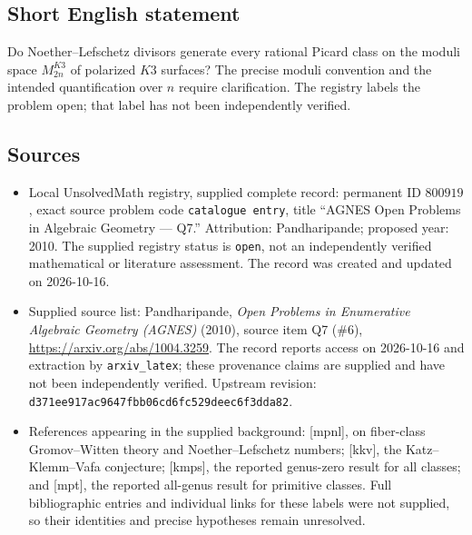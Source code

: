 \documentclass[11pt]{article}
\begin{document}
\subsection{Short English statement}
Do Noether--Lefschetz divisors generate every rational Picard class on the moduli space \(M^{K3}_{2n}\) of polarized \(K3\) surfaces? The precise moduli convention and the intended quantification over \(n\) require clarification. The registry labels the problem open; that label has not been independently verified.
\subsection{Sources}
\begin{itemize}
\item Local UnsolvedMath registry, supplied complete record: permanent ID \(800919\), exact source problem code \texttt{catalogue entry}, title ``AGNES Open Problems in Algebraic Geometry --- Q7.'' Attribution: Pandharipande; proposed year: 2010. The supplied registry status is \texttt{open}, not an independently verified mathematical or literature assessment. The record was created and updated on 2026-10-16.
\item Supplied source list: Pandharipande, \emph{Open Problems in Enumerative Algebraic Geometry (AGNES)} (2010), source item Q7 (\#6), \url{https://arxiv.org/abs/1004.3259}. The record reports access on 2026-10-16 and extraction by \texttt{arxiv\_latex}; these provenance claims are supplied and have not been independently verified. Upstream revision: \texttt{d371ee917ac9647fbb06cd6fc529deec6f3dda82}.
\item References appearing in the supplied background: [mpnl], on fiber-class Gromov--Witten theory and Noether--Lefschetz numbers; [kkv], the Katz--Klemm--Vafa conjecture; [kmps], the reported genus-zero result for all classes; and [mpt], the reported all-genus result for primitive classes. Full bibliographic entries and individual links for these labels were not supplied, so their identities and precise hypotheses remain unresolved.
\end{itemize}
\end{document}
